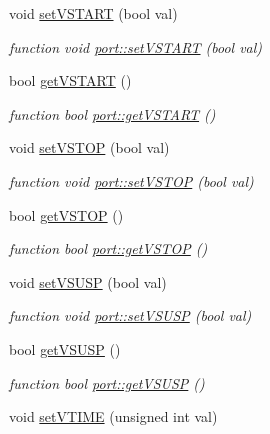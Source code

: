 \begin{DoxyCompactItemize}
void \hyperlink{classport_a54adef359503c44101291e34465c96cb}{set\+V\+S\+T\+A\+RT} (bool val)
\begin{DoxyCompactList}\small\item\em function void \hyperlink{classport_a54adef359503c44101291e34465c96cb}{port\+::set\+V\+S\+T\+A\+RT} (bool val) \end{DoxyCompactList}\item 
bool \hyperlink{classport_a6a3391f362c5da90f1a1d21128de0ed3}{get\+V\+S\+T\+A\+RT} ()
\begin{DoxyCompactList}\small\item\em function bool \hyperlink{classport_a6a3391f362c5da90f1a1d21128de0ed3}{port\+::get\+V\+S\+T\+A\+RT} () \end{DoxyCompactList}\item 
void \hyperlink{classport_ae7956d6922fca348e91bcf3838b9ef64}{set\+V\+S\+T\+OP} (bool val)
\begin{DoxyCompactList}\small\item\em function void \hyperlink{classport_ae7956d6922fca348e91bcf3838b9ef64}{port\+::set\+V\+S\+T\+OP} (bool val) \end{DoxyCompactList}\item 
bool \hyperlink{classport_a7f2941a597bee2be6d1baef10b086593}{get\+V\+S\+T\+OP} ()
\begin{DoxyCompactList}\small\item\em function bool \hyperlink{classport_a7f2941a597bee2be6d1baef10b086593}{port\+::get\+V\+S\+T\+OP} () \end{DoxyCompactList}\item 
void \hyperlink{classport_a4edaec529df920f3b0999e484657e402}{set\+V\+S\+U\+SP} (bool val)
\begin{DoxyCompactList}\small\item\em function void \hyperlink{classport_a4edaec529df920f3b0999e484657e402}{port\+::set\+V\+S\+U\+SP} (bool val) \end{DoxyCompactList}\item 
bool \hyperlink{classport_a7b5ae199c4b371da78674ce9cdba7f01}{get\+V\+S\+U\+SP} ()
\begin{DoxyCompactList}\small\item\em function bool \hyperlink{classport_a7b5ae199c4b371da78674ce9cdba7f01}{port\+::get\+V\+S\+U\+SP} () \end{DoxyCompactList}\item 
void \hyperlink{classport_a43d05a6b037dccbf2666b87d4b49313a}{set\+V\+T\+I\+ME} (unsigned int val)

\end{DoxyCompactItemize}
